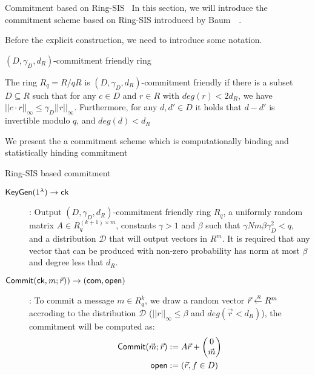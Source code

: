 \begin{section}{Commitment based on  Ring-SIS~\cite{DBLP:journals/iacr/BaumDOP16}}
	In this section, we will introduce the commitment scheme based on Ring-SIS introduced by Baum~\etal~\cite{DBLP:journals/iacr/BaumDOP16}.
	
	Before the explicit construction, we need to introduce some notation.
	
	\begin{definition}{$(D, \gamma_D, d_R)$-commitment friendly ring~\cite{DBLP:journals/iacr/BaumDOP16}}
		
		The ring $R_q = R/qR$ is $(D, \gamma_D, d_R)$-commitment friendly if there is a subset $D \subseteq R$ such that for any $c \in D$ and $r \in R$ with $deg(r) < 2d_R$, we have $||c \cdot r ||_{\infty} \leq \gamma_D||r||_{\infty}$. Furthermore, for any $d, d' \in D$ it holds that $d- d'$ is invertible modulo $q$, and $deg(d)< d_R$
		
	\end{definition}
	
        We present the a commitment scheme which is computationally binding and statistically hinding commitment
        
        \begin{construction}{Ring-SIS based commitment}
          
          \begin{description}
          \item[${\mathsf{KeyGen}}(1^\lambda) \to \mathsf{ck}$]: Output $(D, \gamma_D, d_R)$-commitment friendly ring $R_q$, a uniformly random matrix $A \in R_q^{(k+1) \times m}$, constants $\gamma > 1$ and $\beta$ such that $\gamma Nm\beta \gamma_D^2 < q$, and a distribution $\mathcal{D}$ that will output vectors in $R^m$. It is required that any vector that can be produced with non-zero probability has norm at most $\beta$ and degree less that $d_R$.
            
          \item[${\mathsf{Commit}}(\mathsf{ck}, m; \vec{r})) \to (\mathsf{com}, \mathsf{open})$]: To commit a message $m\in R_q^k$, we draw a random vector $\vec{r} \stackrel{{\scriptscriptstyle \mkern4mu R}}{\gets} R^m$ accroding to the distribution $\mathcal{D}$ ($||r||_{\infty} \leq \beta$ and $deg(\vec{r} < d_R)$), the commitment will be computed as:
            \begin{align*}
              {\mathsf{Commit}}(\vec{m}; \vec{r}) &:= A\vec{r} + \left( \begin{matrix} 0 \\ \vec{m} \end{matrix} \right)\\
              \mathsf{open} &:= (\vec{r}, f\in D)
            \end{align*}
            

\end{description}
\end{construction}
\end{section}
